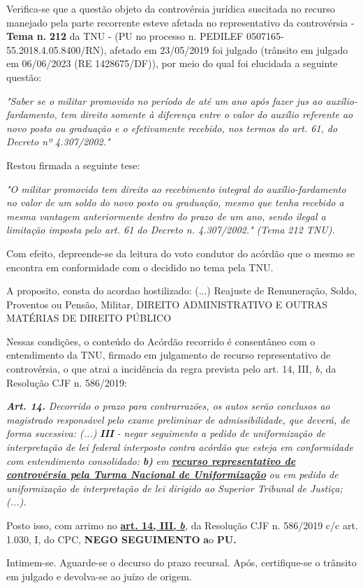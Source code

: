 \documentclass[12pt]{article}
\begin{document}
\justifying
\noindent Verifica-se que a questão objeto da controvérsia jurídica suscitada no recurso manejado pela parte recorrente esteve afetada no representativo da controvérsia - \textbf{Tema n. }\textbf{212} da TNU - (PU no processo n. PEDILEF 0507165-55.2018.4.05.8400/RN),  afetado em 23/05/2019 foi julgado (trânsito em julgado em 06/06/2023 (RE 1428675/DF)), por meio do qual foi elucidada a seguinte questão:

\noindent \textit{"Saber se o militar promovido no período de até um ano após fazer jus ao auxílio-fardamento, tem direito somente à diferença entre o valor do auxílio referente ao novo posto ou graduação e o efetivamente recebido, nos termos do art. 61, do Decreto nº 4.307/2002."}

\noindent Restou firmada a seguinte tese:

\noindent \textit{"O militar promovido tem direito ao recebimento integral do auxílio-fardamento no valor de um soldo do novo posto ou graduação, mesmo que tenha recebido a mesma vantagem anteriormente dentro do prazo de um ano, sendo ilegal a limitação imposta pelo art. 61 do Decreto n. 4.307/2002." (Tema 212 TNU).}

\noindent Com efeito, depreende-se da leitura do voto condutor do acórdão que o mesmo se encontra em conformidade com o decidido no  tema pela TNU.

\noindent A proposito, consta do acordao hostilizado: (...) Reajuste de Remuneração, Soldo, Proventos ou Pensão, Militar, DIREITO ADMINISTRATIVO E OUTRAS MATÉRIAS DE DIREITO PÚBLICO

\noindent Nessas condições, o conteúdo do Acórdão recorrido é consentâneo com o entendimento da TNU, firmado em julgamento de recurso representativo de controvérsia, o que atrai a incidência da regra prevista pelo art. 14, III, \textit{b,} da Resolução CJF n. 586/2019:

\noindent \textit{\textbf{Art. 14.}}\textit{ Decorrido o prazo para contrarrazões, os autos serão conclusos ao magistrado responsável pelo exame preliminar de admissibilidade, que deverá, de forma sucessiva: (...) }\textit{\textbf{III }}\textit{- negar seguimento a pedido de uniformização de interpretação de lei federal interposto contra acórdão que esteja em conformidade com entendimento consolidado: }\textit{\textbf{b)}}\textit{ em }\uline{\textit{\textbf{recurso representativo de controvérsia pela Turma Nacional de Uniformização}}}\textit{ ou em pedido de uniformização de interpretação de lei dirigido ao Superior Tribunal de Justiça;(...).}

\noindent Posto isso, com arrimo no \uline{\textbf{art. 14, III, }}\uline{\textit{\textbf{b}}}\textit{,} da Resolução CJF n. 586/2019 c/c art. 1.030, I, do CPC, \textbf{NEGO SEGUIMENTO }\textbf{a}o\textbf{ PU}\textbf{.}

\noindent Intimem-se. Aguarde-se o decurso do prazo recursal. Após, certifique-se o trânsito em julgado e devolva-se ao juízo de origem.
\end{document}
